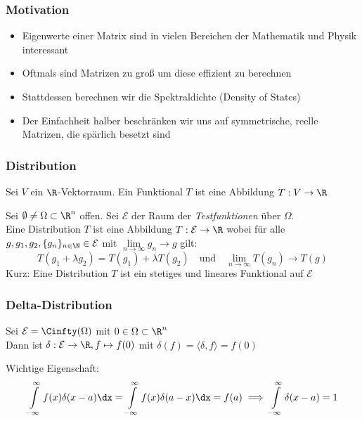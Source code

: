 \begin{frame}
    \frametitle{Motivation}
    \begin{itemize}
        \item Eigenwerte einer Matrix sind in vielen Bereichen der Mathematik und Physik interessant
        \item Oftmals sind Matrizen zu groß um diese effizient zu berechnen
        \item Stattdessen berechnen wir die Spektraldichte (Density of States)
        \item Der Einfachheit halber beschränken wir uns auf symmetrische, reelle Matrizen, die spärlich besetzt sind
    \end{itemize}
\end{frame}

\begin{frame}
    \frametitle{Distribution}
    \begin{definition}[Funktional]
        Sei $V$ ein $\R$-Vektorraum. Ein Funktional $T$ ist eine Abbildung $T: V \to \R$
    \end{definition}
    \begin{definition}[Distribution]
        Sei $\emptyset \neq \Omega \subset \R^n$ offen. Sei $\mathcal{E}$ der Raum der \emph{Testfunktionen} über $\Omega$.\\
        Eine Distribution $T$ ist eine Abbildung $T: \mathcal{E} \to \R$ wobei für alle $g, g_1, g_2, \{g_n\}_{n \in \N} \in \mathcal{E}$
        mit $\lim\limits_{n \to \infty} g_n \to g$ gilt:
        $$T(g_1 + \lambda g_2) = T(g_1) + \lambda T(g_2) \quad \text{und}\quad \lim\limits_{n \to \infty} T(g_n) \to T(g)$$
        Kurz: Eine Distribution $T$ ist ein stetiges und lineares Funktional auf $\mathcal{E}$
    \end{definition}
\end{frame}

\begin{frame}
    \frametitle{Delta-Distribution}
    \begin{definition} 
        Sei $\mathcal{E} = \Cinfty(\Omega)$ mit $0 \in \Omega \subset \R^n$\\
        Dann ist $\delta: \mathcal{E} \to \R, f \mapsto f(0)$ mit $\delta(f) = \langle \delta, f \rangle = f(0)$\\
    \end{definition}
    \vspace{5mm}
    Wichtige Eigenschaft:
    $$\int\limits_{-\infty}^{\infty} f(x) \delta(x-a) \dx = \int\limits_{-\infty}^{\infty} f(x) \delta(a-x) \dx = f(a) \implies \int\limits_{-\infty}^{\infty} \delta(x-a) = 1$$
\end{frame}

